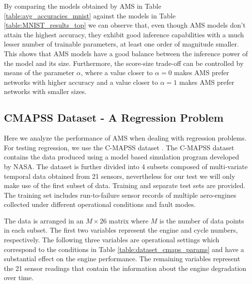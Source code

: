\documentclass[preprint,12pt]{elsarticle}%
\begin{document}
By comparing the models obtained by AMS in Table \ref{table:avg_accuracies_mnist} against the models in Table \ref{table:MNIST_results_top} we can observe that, even though AMS models don't attain the highest accuracy, they exhibit good inference capabilities with a much lesser number of trainable parameters, at least one order of magnitude smaller. This shows that AMS models have a good balance between the inference power of the model and its size. Furthermore, the score-size trade-off can be controlled by means of the parameter $\alpha$, where a value closer to $\alpha=0$ makes AMS prefer networks with higher accuracy and a value closer to $\alpha = 1$ makes AMS prefer networks with smaller sizes.


\subsection{CMAPSS Dataset - A Regression Problem}

Here we analyze the performance of AMS when dealing with regression problems. For testing regression, we use the C-MAPSS dataset \cite{Saxena2008a}. The C-MAPSS dataset contains the data produced using a model based simulation program developed by NASA. The dataset is further divided into 4 subsets composed of multi-variate temporal data obtained from 21 sensors, nevertheless for our test we will only make use of the first subset of data. Training and separate test sets are provided. The training set includes run-to-failure sensor records of multiple aero-engines collected under different operational conditions and fault modes.

The data is arranged in an $M\times26$ matrix where $M$ is the number of data points in each subset. The first two variables represent the engine and cycle numbers, respectively. The following three variables are operational settings which correspond to the conditions in Table \ref{table:dataset_cmaps_params} and have a substantial effect on the engine performance. The remaining variables represent the 21 sensor readings that contain the information about the engine degradation over time.

\begin{table}[!htb]
\begin{center}
\caption{CMAPSS dataset details.}
\label{table:dataset_cmaps_params}
\vspace{12pt}
\end{center}
\end{table}
\end{document}
